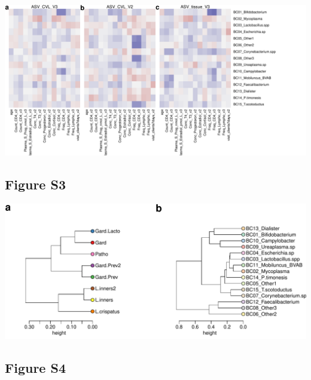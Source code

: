 \documentclass[
]{article}
\begin{document}
\includegraphics[width=1\linewidth]{manuscript_template_files/figure-latex/unnamed-chunk-9-1}

\clearpage

\hypertarget{figure-s3}{%
\subsection{Figure S3}\label{figure-s3}}

\includegraphics[width=1\linewidth]{manuscript_template_files/figure-latex/unnamed-chunk-10-1}

\clearpage

\hypertarget{figure-s4}{%
\subsection{Figure S4}\label{figure-s4}}
\end{document}
